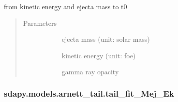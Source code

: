 \documentclass[letterpaper,10pt,english]{sphinxmanual}
\begin{document}
\begin{fulllineitems}
\label{\detokenize{generated/sdapy.models.arnett_tail.Mej_Ek_to_t0:sdapy.models.arnett_tail.Mej_Ek_to_t0}}
from kinetic energy and ejecta mass to t0
\begin{quote}\begin{description}
\item[{Parameters}] \leavevmode\begin{description}
\item[{}] \leavevmode{[}\sphinxtitleref{float}{]}
ejecta mass (unit: solar mass)

\item[{}] \leavevmode{[}\sphinxtitleref{float}{]}
kinetic energy (unit: foe)

\item[{}] \leavevmode{[}\sphinxtitleref{float}{]}
gamma ray opacity

\end{description}

\end{description}\end{quote}

\end{fulllineitems}



\subsubsection{sdapy.models.arnett\_tail.tail\_fit\_Mej\_Ek}
\label{\detokenize{generated/sdapy.models.arnett_tail.tail_fit_Mej_Ek:sdapy-models-arnett-tail-tail-fit-mej-ek}}\label{\detokenize{generated/sdapy.models.arnett_tail.tail_fit_Mej_Ek::doc}}
\end{document}
